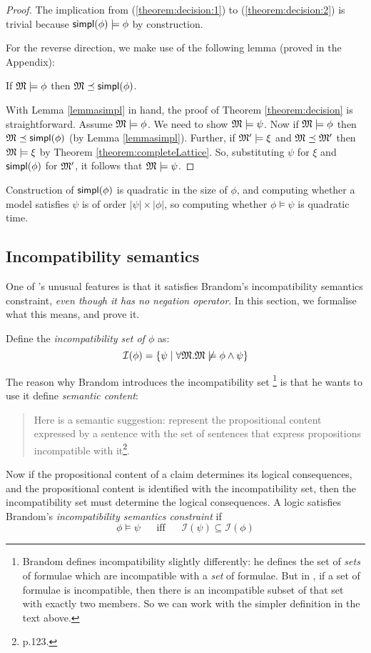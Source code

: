 \begin{proof}
The implication from  (\ref{theorem:decision:1}) to
(\ref{theorem:decision:2}) is trivial because $\mathsf{simpl}(\phi) \models \phi$ by construction.

For the reverse direction, we make use of the following lemma (proved in the Appendix):
\begin{lemma}
\label{lemmasimpl}
If $\frak{M} \models \phi$ then $\frak{M} \preceq \mathsf{simpl}(\phi)$.
\end{lemma}

With Lemma \ref{lemmasimpl} in hand, the proof of Theorem \ref{theorem:decision} is straightforward.
Assume $\frak{M} \models \phi$. We need to show
$\frak{M} \models \psi$.  Now if $\frak{M} \models \phi$ then $\frak{M} \preceq
\mathsf{simpl}(\phi)$ (by Lemma \ref{lemmasimpl}).  Further, if $\frak{M}' \models \xi $
and $\frak{M} \preceq \frak{M}'$ then $\frak{M} \models \xi $ by Theorem
\ref{theorem:completeLattice}. So, substituting $\psi$ for $\xi $ and
$\mathsf{simpl}(\phi)$ for $\frak{M}'$, it follows that $\frak{M} \models \psi$.
\end{proof}

Construction of $\mathsf{simpl}(\phi)$ is quadratic in the size of $\phi$,
and computing whether a model satisfies $\psi$ is of order $|\psi|
\times |\phi|$, so computing whether $\phi \models \psi$ is quadratic
time.

\subsection{Incompatibility semantics}\label{incompatibility}

\NI One of \cathoristic{}'s unusual features is that it satisfies Brandom's incompatibility semantics constraint, \emph{even though it has no negation operator}.
In this section, we formalise what
this means, and prove it.

Define the \emph{incompatibility set of $\phi$} as:
\[
\mathcal{I}(\phi) = \{
  \psi \; | \; \forall \frak{M}. \frak{M} \not \models \phi \land \psi\}
\]

\NI The reason why Brandom introduces the incompatibility set
\footnote{Brandom \cite{brandom} defines incompatibility slightly
  differently: he defines the set of \emph{sets} of formulae which are
  incompatible with a \emph{set} of formulae.  But in \cathoristic{},
  if a set of formulae is incompatible, then there is an incompatible
  subset of that set with exactly two members.  So we can work with
  the simpler definition in the text above.} is that he
wants to use it define \emph{semantic content}:
\begin{quote}
  Here is a semantic suggestion: represent the propositional content
  expressed by a sentence with the set of sentences that express
  propositions incompatible with it\footnote{\cite{brandom} p.123.}.
\end{quote}
Now if the propositional content of a claim determines its logical consequences, and the propositional content is identified with the incompatibility set, then the incompatibility set must determine the logical consequences.
A logic satisfies Brandom's \emph{incompatibility semantics constraint} if
\[
\phi \models \psi \; \quad\mbox{ iff }\quad \; \mathcal{I}(\psi) \subseteq \mathcal{I}(\phi)
\]


